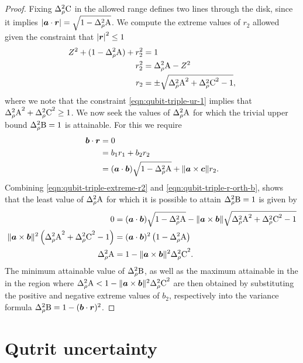 \begin{proof}
Fixing $\varr{\opc}$ in the allowed range defines two lines through the disk, since it implies $\abs{\boa\cdot\bor} = \sqrt{1-\varr{\opa}}$. We compute the extreme values of $r_2$ allowed given the constraint that ${\left\lvert{\bm{r}}\right\rvert}^2\leq 1$
\begin{align}
  Z^2 + (1-\varr{\opa}) + r_2^2 &= 1\\
  r_2^2 &= \varr{\opa} - Z^2\\
  r_2 &= \pm\sqrt{\varr{\opa}^2 + \varr{\opc}^2 - 1},\label{eqn:qubit-triple-extreme-r2}
\end{align}
where we note that the constraint \eqref{eqn:qubit-triple-ur-1} implies that $\varr{\opa}^2 + \varr{\opc}^2 \geq 1$. We now seek the values of $\varr{\opa}$ for which the trivial upper bound $\varr{\opb} = 1$ is attainable. For this we require
\begin{align}
  \bob\cdot\bor &= 0\\
                &= b_1 r_1 + b_2 r_2 \\
                &= (\boa\cdot\bob) \sqrt{1-\varr{\opa}} + \norm{\boa\times\boc}{} r_2.\label{eqn:qubit-triple-r-orth-b}
\end{align}
Combining \eqref{eqn:qubit-triple-extreme-r2} and \eqref{eqn:qubit-triple-r-orth-b}, shows that the least value of $\varr{\opa}$ for which it is possible to attain $\varr{\opb}=1$ is given by
\begin{align}
  0 &= (\boa\cdot\bob) \sqrt{1-\varr{\opa}} - \norm{\boa\times\bob}{}\sqrt{\varr{\opa}^2 + \varr{\opc}^2 - 1}\\
  \norm{\boa\times\bob}{}^2\left(\varr{\opa}^2 + \varr{\opc}^2 - 1\right) &= (\boa\cdot\bob)^2 \left(1-\varr{\opa}\right)\\
  \varr{\opa} &= 1-\norm{\boa\times\bob}{}^2\varr{\opc}^2.
\end{align}
The minimum attainable value of $\varr{\opb}$, as well as the maximum attainable in the in the region where $\varr{\opa} < 1-\norm{\boa\times\bob}{}^2\varr{\opc}^2$ are then obtained by substituting the positive and negative extreme values of $b_2$, respectively into the variance formula $\varr{\opb} = 1- (\bob\cdot\bor)^2$.
\end{proof}

\section{Qutrit uncertainty}
\label{sec:qutrit}
